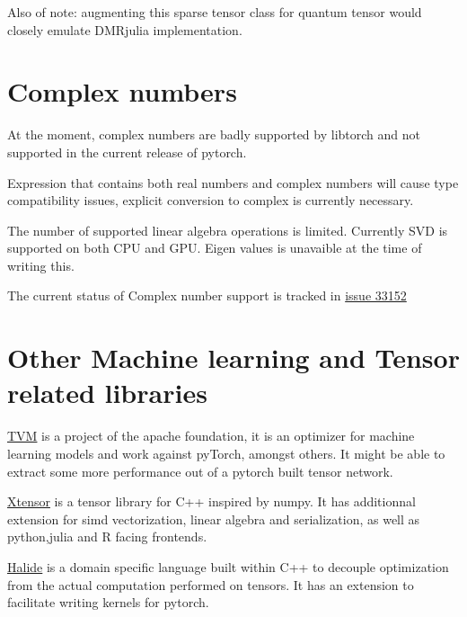 \documentclass[15pt]{report}
\begin{document}
Also of note: augmenting this sparse tensor class for quantum tensor would closely emulate DMRjulia implementation.

\section{Complex numbers}
At the moment, complex numbers are badly supported by libtorch and not supported in the current release of pytorch.

Expression that contains both real numbers and complex numbers will cause type compatibility issues, explicit conversion to complex is currently necessary.

The number of supported linear algebra operations is limited. Currently SVD is supported on both CPU and GPU.
Eigen values is unavaible at the time of writing this.

The current status of Complex number support is tracked in \href{https://github.com/pytorch/pytorch/issues/33152}{issue 33152}

\section{Other Machine learning and Tensor related libraries}

\href{http://tvm.apache.org/}{TVM} is a project of the apache foundation, it is an optimizer for machine learning models and work against pyTorch, amongst others.
It might be able to extract some more performance out of a pytorch built tensor network.

\href{https://github.com/xtensor-stack/xtensor}{Xtensor} is a tensor library for C++ inspired by numpy. It has additionnal extension for simd vectorization, linear algebra and serialization, as well as python,julia and R facing frontends.

\href{https://halide-lang.org/}{Halide} is a domain specific language built within C++ to decouple optimization from the actual computation performed on tensors. It has an extension to facilitate writing kernels for pytorch.
\end{document}
